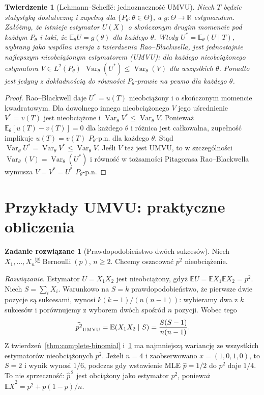 \documentclass[11pt,a4paper,oneside]{report}
\numberwithin{equation}{chapter}
\theoremstyle{plain}
\newtheorem{twierdzenie}{Twierdzenie}[chapter]
\theoremstyle{definition}
\newtheorem{zadanie}{Zadanie rozwiązane}[chapter]
\theoremstyle{remark}
\newcommand{\R}{\mathbb R}
\newcommand{\E}{\mathbb E}
\newcommand{\Var}{\operatorname{Var}}
\newcommand{\iid}{\mathrel{\overset{\mathrm{iid}}\sim}}
\begin{document}
\begin{twierdzenie}[Lehmann--Scheffé: jednoznaczność UMVU]
\label{thm:lehmann-scheffe}
Niech $T$ będzie statystyką dostateczną i zupełną dla
$\{P_\theta:\theta\in\Theta\}$, a $g:\Theta\to\R$ estymandem.
Załóżmy, że istnieje estymator $U(X)$ o skończonym drugim
momencie pod każdym $P_\theta$ i taki, że
$\E_\theta U=g(\theta)$ dla każdego $\theta$.
Wtedy $U^*=\E_\theta(U\mid T)$, wybrany jako wspólna
wersja z twierdzenia Rao--Blackwella, jest \emph{jednostajnie
najlepszym nieobciążonym estymatorem} (UMVU): dla każdego
nieobciążonego estymatora $V\in L^2(P_\theta)$
$\Var_\theta(U^*)\le\Var_\theta(V)$ dla wszystkich $\theta$.
Ponadto jest jedyny z dokładnością do równości
$P_\theta$-prawie na pewno dla każdego $\theta$.
\end{twierdzenie}
\begin{proof}
Rao--Blackwell daje $U^*=u(T)$ nieobciążony i o skończonym
momencie kwadratowym. Dla dowolnego innego nieobciążonego
$V$ jego uśrednienie $V^*=v(T)$ jest nieobciążone i
$\Var_\theta V^*\le\Var_\theta V$. Ponieważ
$\E_\theta[u(T)-v(T)]=0$ dla każdego $\theta$ i różnica
jest całkowalna, zupełność implikuje
$u(T)=v(T)$ $P_\theta$-p.n. dla każdego $\theta$.
Stąd $\Var_\theta U^*=\Var_\theta V^*\le\Var_\theta V$.
Jeśli $V$ też jest UMVU, to w szczególności
$\Var_\theta(V)=\Var_\theta(U^*)$ i równość w tożsamości
Pitagorasa Rao--Blackwella wymusza
$V=V^*=U^*$ $P_\theta$-p.n.
\end{proof}

\section{Przykłady UMVU: praktyczne obliczenia}
\begin{zadanie}[Prawdopodobieństwo dwóch sukcesów]
\label{zad:umvu-p2}
Niech $X_1,\ldots,X_n\iid\operatorname{Bernoulli}(p)$,
$n\ge2$. Chcemy oszacować $p^2$ nieobciążenie.
\par\emph{Rozwiązanie.} Estymator $U=X_1X_2$ jest nieobciążony,
gdyż $\E U=\E X_1\E X_2=p^2$.
Niech $S=\sum_iX_i$. Warunkowo na $S=k$ prawdopodobieństwo,
że pierwsze dwie pozycje są sukcesami, wynosi
$k(k-1)/(n(n-1))$: wybieramy dwa z $k$ sukcesów i
porównujemy z wyborem dwóch spośród $n$ pozycji. Wobec tego
\[
\widehat{p^2}_{\rm UMVU}=\E(X_1X_2\mid S)
=\frac{S(S-1)}{n(n-1)}.
\]
Z twierdzeń~\ref{thm:complete-binomial} i~\ref{thm:lehmann-scheffe}
ma najmniejszą wariancję ze wszystkich estymatorów
nieobciążonych $p^2$. Jeżeli $n=4$ i zaobserwowano
$x=(1,0,1,0)$, to $S=2$ i wynik wynosi $1/6$, podczas gdy
wstawienie MLE $\widehat p=1/2$ do $p^2$ daje $1/4$.
To nie sprzeczność: $\widehat p^{\,2}$ jest obciążony jako
estymator $p^2$, ponieważ
$\E\bar X^2=p^2+p(1-p)/n$.
\end{zadanie}
\end{document}
